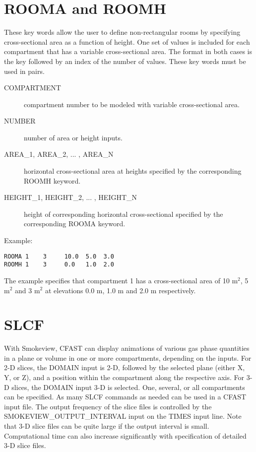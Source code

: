 \section{ROOMA and ROOMH}

These key words allow the user to define non-rectangular rooms by specifying cross-sectional area as a function of height. One set of values is included for each compartment that has a variable cross-sectional area. The format in both cases is the key followed by an index of the number of values. These key words must be used in pairs.

\begin{adjustwidth}{1cm}{0cm}
\begin{description}
  \item[COMPARTMENT] compartment number to be modeled with variable cross-sectional area.
  \item[NUMBER] number of area or height inputs.
  \item[AREA\_1, AREA\_2, ... , AREA\_N] horizontal cross-sectional area at heights specified by the corresponding ROOMH keyword.
  \item[HEIGHT\_1, HEIGHT\_2, ... , HEIGHT\_N] height of corresponding horizontal cross-sectional specified by the corresponding ROOMA keyword.
\end{description}
\end{adjustwidth}

\noindent Example:

\begin{lstlisting}
ROOMA 1    3     10.0  5.0  3.0
ROOMH 1    3     0.0   1.0  2.0
\end{lstlisting}

The example specifies that compartment 1 has a cross-sectional area of 10 m$^2$, 5 m$^2$ and 3 m$^2$ at elevations 0.0 m, 1.0 m and 2.0 m respectively.

\section{SLCF}

With Smokeview, CFAST can display animations of various gas phase quantities in a plane or volume in one or more compartments, depending on the inputs. For 2-D slices, the DOMAIN input is 2-D, followed by the selected plane (either X, Y, or Z), and a position within the compartment along the respective axis. For 3-D slices, the DOMAIN input 3-D is selected. One, several, or all compartments can be specified. As many SLCF commands as needed can be used in a CFAST input file.  The output frequency of the slice files is controlled by the SMOKEVIEW\_OUTPUT\_INTERVAL input on the TIMES input line. Note that 3-D slice files can be quite large if the output interval is small. Computational time can also increase significantly with specification of detailed 3-D slice files.

